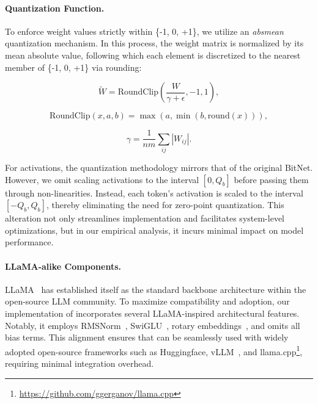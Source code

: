 \paragraph{Quantization Function.} To enforce weight values strictly within \{-1, 0, +1\}, we utilize an \emph{absmean} quantization mechanism. In this process, the weight matrix is normalized by its mean absolute value, following which each element is discretized to the nearest member of \{-1, 0, +1\} via rounding:

\begin{equation}
    \widetilde{W} = \mathrm{RoundClip}\left(\frac{W}{\gamma + \epsilon}, -1, 1\right),
\end{equation}

\begin{equation}
    \mathrm{RoundClip}(x, a, b) = \max(a, \min(b, \mathrm{round}(x))),
\end{equation}

\begin{equation}
    \gamma = \frac{1}{nm}\sum_{ij} |W_{ij}|.
\end{equation}

For activations, the quantization methodology mirrors that of the original BitNet. However, we omit scaling activations to the interval $[0, Q_b]$ before passing them through non-linearities. Instead, each token's activation is scaled to the interval $[-Q_b, Q_b]$, thereby eliminating the need for zero-point quantization. This alteration not only streamlines implementation and facilitates system-level optimizations, but in our empirical analysis, it incurs minimal impact on model performance.

\paragraph{LLaMA-alike Components.}

LLaMA~\cite{llama, llama2} has established itself as the standard backbone architecture within the open-source LLM community. To maximize compatibility and adoption, our implementation of  incorporates several LLaMA-inspired architectural features. Notably, it employs RMSNorm~\cite{rmsnorm}, SwiGLU~\cite{swiglu}, rotary embeddings~\cite{rope}, and omits all bias terms. This alignment ensures that  can be seamlessly used with widely adopted open-source frameworks such as Huggingface, vLLM~\cite{vllm}, and llama.cpp\footnote{\url{https://github.com/ggerganov/llama.cpp}}, requiring minimal integration overhead.


